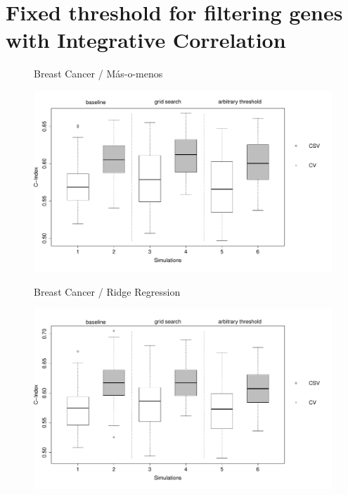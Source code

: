 \documentclass{article}
\begin{document}
\newpage

\section{Fixed threshold for filtering genes with Integrative Correlation}

  \begin{figure}[H]
      \centering
        \begin{minipage}[b]{1\textwidth}
       		\centerline{Breast Cancer / M\'{a}s-o-menos}
            \includegraphics[width=16cm]{breast_masomenos_filter_cutoff.pdf}            
        \end{minipage}
        \begin{minipage}[b]{1\textwidth}
       		\centerline{Breast Cancer / Ridge Regression}
            \includegraphics[width=16cm]{breast_ridge_filter_cutoff.pdf}            
        \end{minipage}
  \end{figure}
\end{document}

